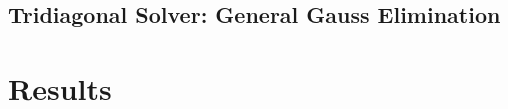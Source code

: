 \documentclass[12pt]{article}
\begin{document}
\subsection{Tridiagonal Solver: General Gauss Elimination}
%
%

\section{Results}
\end{document}
